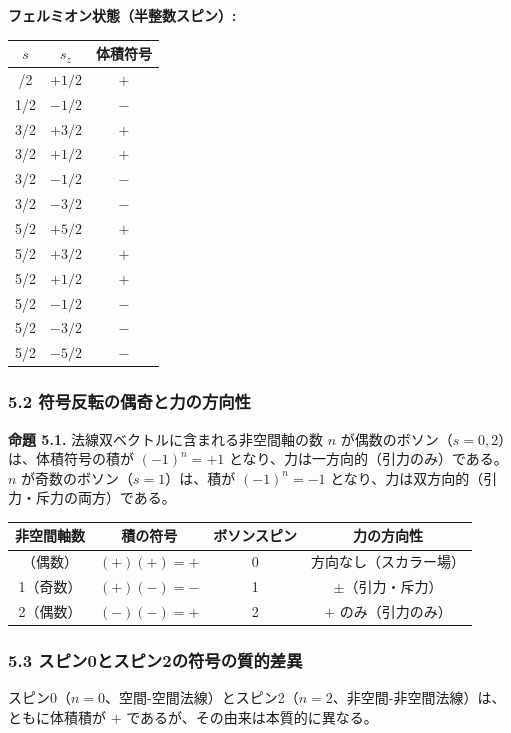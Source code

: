 \documentclass[a4paper,11pt]{ltjsarticle}
\newcounter{none}
\begin{document}
\textbf{フェルミオン状態（半整数スピン）:}

{\def\LTcaptype{none}
\begin{longtable}[]{@{}ccc@{}}
\toprule
$s$ & $s_z$ & 体積符号 \\
\midrule
\endhead
\bottomrule
\endlastfoot
1/2 & $+1/2$ & $+$ \\
1/2 & $-1/2$ & $-$ \\
3/2 & $+3/2$ & $+$ \\
3/2 & $+1/2$ & $+$ \\
3/2 & $-1/2$ & $-$ \\
3/2 & $-3/2$ & $-$ \\
5/2 & $+5/2$ & $+$ \\
5/2 & $+3/2$ & $+$ \\
5/2 & $+1/2$ & $+$ \\
5/2 & $-1/2$ & $-$ \\
5/2 & $-3/2$ & $-$ \\
5/2 & $-5/2$ & $-$ \\
\end{longtable}
}

\subsubsection*{5.2 符号反転の偶奇と力の方向性}

\textbf{命題 5.1.} 法線双ベクトルに含まれる非空間軸の数 $n$ が偶数のボソン（$s = 0, 2$）は、体積符号の積が $(-1)^n = +1$ となり、力は一方向的（引力のみ）である。$n$ が奇数のボソン（$s = 1$）は、積が $(-1)^n = -1$ となり、力は双方向的（引力・斥力の両方）である。

{\def\LTcaptype{none}
\begin{longtable}[]{@{}cccc@{}}
\toprule
非空間軸数 & 積の符号 & ボソンスピン & 力の方向性 \\
\midrule
\endhead
\bottomrule
\endlastfoot
0（偶数） & $(+)(+) = +$ & 0 & 方向なし（スカラー場） \\
1（奇数） & $(+)(-) = -$ & 1 & $\pm$（引力・斥力） \\
2（偶数） & $(-)(-) = +$ & 2 & $+$ のみ（引力のみ） \\
\end{longtable}
}

\subsubsection*{5.3 スピン0とスピン2の符号の質的差異}

スピン0（$n = 0$、空間-空間法線）とスピン2（$n = 2$、非空間-非空間法線）は、ともに体積積が $+$ であるが、その由来は本質的に異なる。
\end{document}
